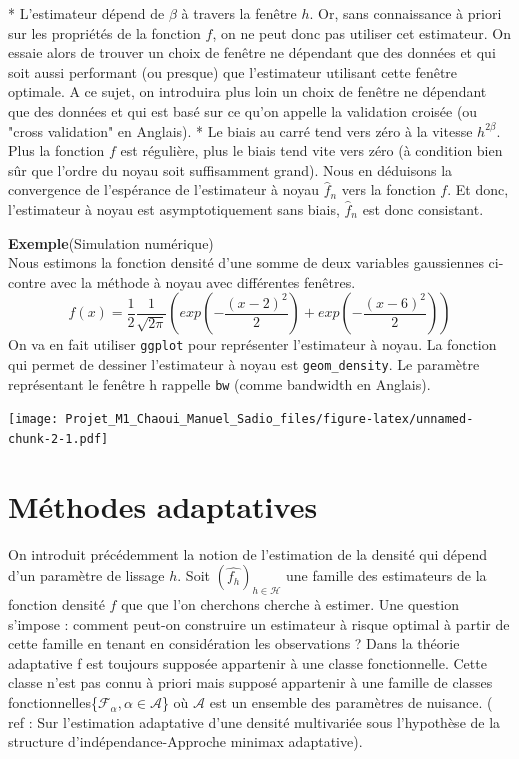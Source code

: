 \documentclass[
]{book}
\begin{document}
\begin{cmtr} 
 * L'estimateur dépend de $\beta$ à travers la fenêtre $h$. Or, sans connaissance à priori sur les propriétés de la fonction $f$, on ne peut donc pas utiliser cet estimateur. On essaie alors de trouver un choix de fenêtre ne dépendant que des données et qui soit aussi performant (ou presque) que l'estimateur utilisant cette fenêtre optimale. A ce sujet, on introduira plus loin un choix de fenêtre ne dépendant que des données et qui est basé sur ce qu'on appelle la validation croisée (ou "cross validation" en Anglais).  \newline
 * Le biais au carré tend vers zéro à la vitesse $h^{2\beta}$. Plus la fonction $f$ est régulière, plus le biais tend vite vers zéro (à condition bien sûr que l'ordre du noyau soit suffisamment grand). Nous en déduisons la convergence de l'espérance de l'estimateur à noyau $\hat {f}_n$ vers la fonction $f$. Et donc, l'estimateur à noyau est asymptotiquement sans biais, $\hat {f}_n$ est donc consistant.

\end{cmtr}

\textbf{Exemple}(Simulation numérique)\\
Nous estimons la fonction densité d'une somme de deux variables gaussiennes ci-contre avec la méthode à noyau avec différentes fenêtres.
\[
f(x)=\frac{1}{2}\frac{1}{\sqrt{2\pi}}(exp(-\frac{(x-2)^2}{2})+exp(-\frac{(x-6)^2}{2}))
\]
On va en fait utiliser \texttt{ggplot} pour représenter l'estimateur à noyau. La fonction qui permet de dessiner l'estimateur à noyau est \texttt{geom\_density}. Le paramètre représentant le fenêtre h rappelle \texttt{bw} (comme bandwidth en Anglais).

\texttt{[image: Projet\_M1\_Chaoui\_Manuel\_Sadio\_files/figure-latex/unnamed-chunk-2-1.pdf]}

\hypertarget{muxe9thodes-adaptatives}{%
\section{Méthodes adaptatives}\label{muxe9thodes-adaptatives}}

\hspace*{0.5cm} On introduit précédemment la notion de l'estimation de la densité qui dépend d'un paramètre de lissage \(h\). Soit \((\hat{f_h})_{h\in \mathcal H}\) une famille des estimateurs de la fonction densité \(f\) que que l'on cherchons cherche à estimer.\newline
Une question s'impose : comment peut-on construire un estimateur à risque optimal à partir de cette famille en tenant en considération les observations ? \newline
Dans la théorie adaptative f est toujours supposée appartenir à une classe fonctionnelle. Cette classe n'est pas connu à priori mais supposé appartenir à une famille de classes fonctionnelles\{\(\mathcal{F_{\alpha}},\alpha \in\mathcal{A}\)\} où \(\mathcal{A}\) est un ensemble des paramètres de nuisance. ( ref : Sur l'estimation adaptative d'une densité multivariée sous l'hypothèse de la structure d'indépendance-Approche minimax adaptative).\newline
\end{document}
